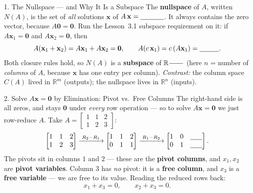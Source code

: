 \documentclass[10pt]{article}
\newcommand{\xx}{\mathbf{x}}
\newcommand{\zero}{\mathbf{0}}
\begin{document}
\begin{notesbox}{1. The Nullspace --- and Why It Is a Subspace}
The \textbf{nullspace} of $A$, written $N(A)$, is the set of \emph{all} solutions $\xx$ of
$A\,\xx=\blank{1.2cm}$. It always contains the zero vector, because $A\zero=\zero$. Run the Lesson~3.1
subspace requirement on it: if $A\xx_1=\zero$ and $A\xx_2=\zero$, then
\[
  A(\xx_1+\xx_2)=A\xx_1+A\xx_2=\zero, \qquad A(c\,\xx_1)=c\,(A\xx_1)=\blank{1.0cm}.
\]
Both closure rules hold, so $N(A)$ is a \textbf{subspace} of $\mathbb{R}^{\,\blank{0.7cm}}$ (here $n$ =
number of \emph{columns} of $A$, because $\xx$ has one entry per column). \emph{Contrast:} the column
space $C(A)$ lived in $\mathbb{R}^m$ (outputs); the nullspace lives in $\mathbb{R}^n$ (inputs).
\end{notesbox}

\begin{notesbox}{2. Solve $A\xx=\zero$ by Elimination: Pivot vs.\ Free Columns}
The right-hand side is all zeros, and stays $\zero$ under \emph{every} row operation --- so to solve
$A\xx=\zero$ we just row-reduce $A$. Take $A=\begin{bmatrix} 1 & 1 & 2 \\ 1 & 2 & 3 \end{bmatrix}$:
\[
  \begin{bmatrix} 1 & 1 & 2 \\ 1 & 2 & 3 \end{bmatrix}
  \xrightarrow{\;R_2-R_1\;}
  \begin{bmatrix} 1 & 1 & 2 \\ 0 & 1 & 1 \end{bmatrix}
  \xrightarrow{\;R_1-R_2\;}
  \begin{bmatrix} 1 & 0 & \blank{0.6cm} \\ 0 & 1 & \blank{0.6cm} \end{bmatrix}.
\]
The pivots sit in columns $1$ and $2$ --- these are the \textbf{pivot columns}, and $x_1,x_2$ are
\textbf{pivot variables}. Column $3$ has \emph{no} pivot: it is a \textbf{free column}, and $x_3$ is a
\textbf{free variable} --- we are free to \blank{2.6cm} its value. Reading the reduced rows back:
\[
  x_1 + x_3 = 0, \qquad x_2 + x_3 = 0.
\]
\end{notesbox}
\end{document}
